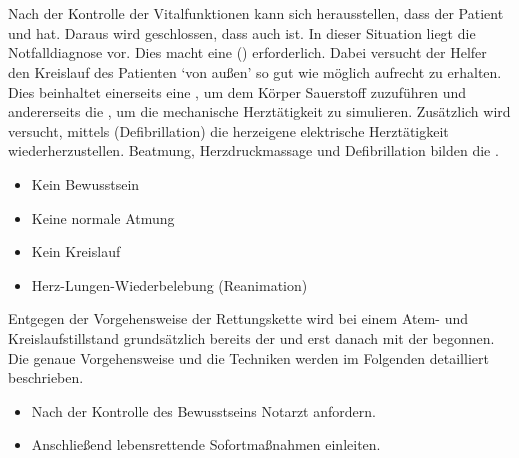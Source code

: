 \clearpage
{}

\section{}

\TextSlide{\TxBeschreibung}
{%
Nach der Kontrolle der Vitalfunktionen kann sich
herausstellen, dass der Patient  und
 hat. 
%
Daraus wird geschlossen, dass auch  ist. 
%
In dieser Situation liegt die Notfalldiagnose
 vor. 
Dies macht eine  () erforderlich. 
%
Dabei versucht der Helfer den Kreislauf des Patienten \enquote*{von
außen} so gut wie möglich aufrecht zu
erhalten. 
%
Dies beinhaltet einerseits eine , 
um dem Körper Sauerstoff zuzuführen 
und andererseits die , 
um die mechanische Herztätigkeit zu simulieren. 
%
Zusätzlich wird versucht, mittels 
 (Defibrillation) 
die herzeigene elektrische Herztätigkeit wiederherzustellen.
%
Beatmung, Herzdruckmassage und Defibrillation
bilden die .
%
}{
\begin{itemize}
  \item Kein Bewusstsein
  \item Keine normale Atmung
  \item Kein Kreislauf
  \item Herz-Lungen-Wiederbelebung (Reanimation)
\end{itemize}
}{}{}{}

{Entgegen der Vorgehensweise der Rettungskette wird bei
einem Atem- und Kreislaufstillstand grundsätzlich bereits
 der  und erst danach mit der  begonnen. Die genaue Vorgehensweise und die
Techniken werden im Folgenden detailliert beschrieben.
\bigskip }{
\begin{itemize}
  \item Nach der Kontrolle des Bewusstseins Notarzt anfordern.
  \item Anschließend lebensrettende Sofortmaßnahmen einleiten.
\end{itemize}
}{}{}{}

